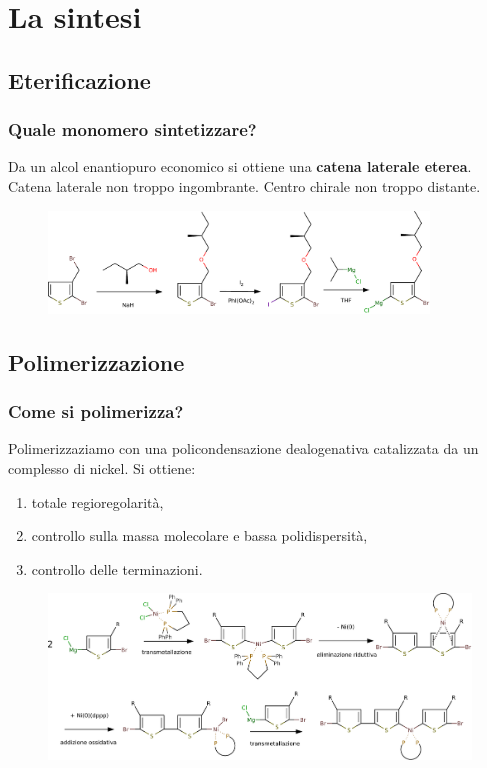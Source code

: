 \documentclass{beamer}
\begin{document}
\section{La sintesi}
\subsection{Eterificazione}
\begin{frame}%
\frametitle{Quale monomero sintetizzare?}
Da un alcol enantiopuro economico si ottiene una \textbf{catena laterale eterea}.
\vfill
Catena laterale non troppo ingombrante. Centro chirale non troppo distante.
\vfill
\begin{figure}\centering \includegraphics[width=0.9\textwidth]{img/syn-monomero2.pdf}\end{figure}
\end{frame}
\subsection{Polimerizzazione}
\begin{frame}%
\frametitle{Come si polimerizza?}
Polimerizzaziamo con una policondensazione dealogenativa catalizzata da un complesso di nickel. Si ottiene:
\vfill
\begin{enumerate} 
\item totale regioregolarità,
\item controllo sulla massa molecolare e bassa polidispersità,
\item controllo delle terminazioni.
\end{enumerate}
\vfill
\begin{figure}\centering \includegraphics[width=1\textwidth]{img/syn-polimero-lunga.pdf}\end{figure}
\end{frame}
\end{document}
